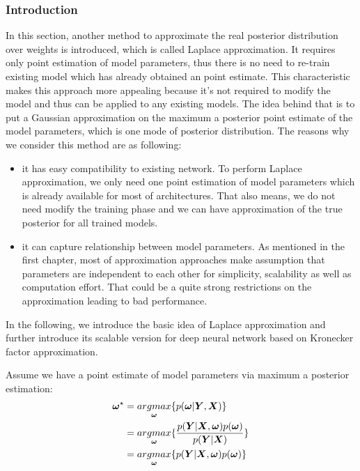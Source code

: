 \subsubsection{Introduction}
In this section, another method to approximate the real posterior distribution over weights is introduced, which is called Laplace approximation\cite{bishop2006pattern}. It requires only point estimation of model parameters, thus there is no need to re-train existing model which has already obtained an point estimate. This characteristic makes this approach more appealing  because it's not required to modify the model and thus can be applied to any existing models. The idea behind that is to put a Gaussian approximation on the maximum a posterior point estimate of the model parameters, which is one mode of posterior distribution. The reasons why we consider this method are as following:
\begin{itemize}
	\item it has easy compatibility to existing network. To perform Laplace approximation, we only need one point estimation of model parameters which is already available for most of architectures. That also means, we do not need modify the training phase and we can have approximation of the true posterior for all trained models.
	\item it can capture relationship between model parameters. As mentioned in the first chapter, most of approximation approaches make assumption that parameters are independent to each other for simplicity, scalability as well as computation effort. That could be a quite strong restrictions on the approximation leading to bad performance.
\end{itemize}

In the following, we introduce the basic idea of Laplace approximation and further introduce its scalable version for deep neural network based on Kronecker factor approximation.

Assume we have a point estimate of model parameters via maximum a posterior estimation:
\begin{equation}
\begin{aligned} \label{point estimate}
\boldsymbol \omega^\star &= \underset{\boldsymbol \omega}{argmax}\{p(\boldsymbol \omega|\boldsymbol Y,\boldsymbol X)\} \\
&= \underset{\boldsymbol \omega}{argmax}\{\frac{p(\boldsymbol Y|\boldsymbol X, \boldsymbol \omega) p(\boldsymbol \omega)}{p(\boldsymbol Y | \boldsymbol X)}\} \\
&= \underset{\boldsymbol \omega}{argmax}\{p(\boldsymbol Y|\boldsymbol X, \boldsymbol \omega) p(\boldsymbol \omega)\}
\end{aligned}
\end{equation}


